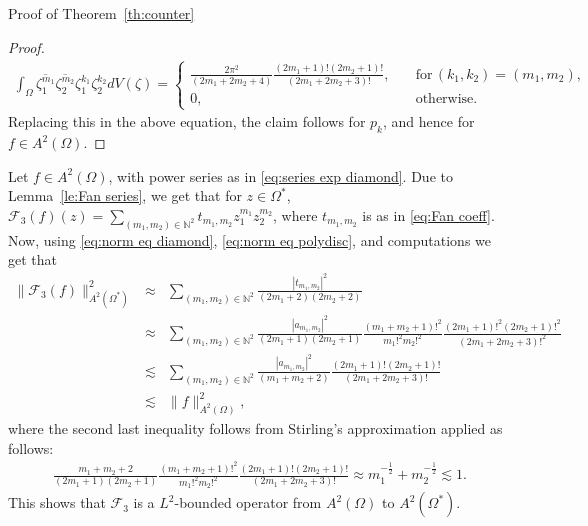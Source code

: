 \documentclass[11pt, oneside, reqno]{amsart}
\numberwithin{equation}{section}
\theoremstyle{definition}
\newcommand{\beas}{\begin{eqnarray*}}
\newcommand{\eeas}{\end{eqnarray*}}
\newcommand{\N}{\mathbb N}
\newcommand{\F}{\mathcal F}
\newcommand{\ltt}{\left(}
\newcommand{\rtt}{\right)}
\newcommand{\Om}{\Omega}
\begin{document}
{\begin{section}{Proof of Theorem~\ref{th:counter}}
\begin{proof}
      \beas
      \int_{\Om}\overline{\zeta_1^{m_1}}\overline{\zeta_2^{m_2}}\zeta_1^{k_1}\zeta_2^{k_2} dV(\zeta)=\begin{cases}
         \frac{2\pi^2}{\ltt 2m_1+2m_2+4\rtt}\frac{{\ltt 2m_1+1\rtt!}{\ltt 2m_2+1\rtt!}}{{\ltt 2m_1+2m_2+3\rtt!}},&\quad \text{for}\,(k_1,k_2)=(m_1,m_2),\\
         0,&\quad \text{otherwise}.
      \end{cases}
      \eeas
      Replacing this in the above equation, the claim follows for $p_k$, and hence for $f\in A^2\ltt\Om\rtt$.
       \end{proof}

       Let $f\in A^2\ltt\Om\rtt$, with power series as in \eqref{eq:series exp diamond}.  Due to Lemma~\ref{le:Fan series}, we get that for $z\in\Om^*$, $\F_3\ltt f\rtt(z)=\sum\limits_{(m_1,m_2)\in\N^2}t_{m_1,m_2} z_1^{m_1}z_2^{m_2}$, where
      $t_{m_1,m_2}$ is as in \eqref{eq:Fan coeff}.
    Now, using \eqref{eq:norm eq diamond}, \eqref{eq:norm eq polydisc}, and computations we get that
    \beas
    \|\F_3\ltt f\rtt\|_{A^2\ltt\Om^*\rtt}^2 &\approx&
\sum_{(m_1,m_2)\in \N^2}\frac{|t_{m_1,m_2}|^2}{(2m_1+2)(2m_2+2)}\\
&\approx&\sum_{(m_1,m_2)\in \N^2}\frac{\left|a_{m_1,m_2}\right|^2}{\ltt 2m_1+1\rtt\ltt 2m_2+1\rtt}\frac{{\ltt m_1+m_2+1\rtt!}^2}{{m_1!}^2 {m_2!}^2}\frac{{\ltt 2m_1+1\rtt!}^2{\ltt 2m_2+1\rtt!}^2}{{\ltt 2m_1+2m_2+3\rtt!}^2}
\\
&\lesssim& \sum_{(m_1,m_2)\in \N^2}\frac{|a_{m_1,m_2}|^2}{(m_1+m_2+2)}\frac{{\ltt 2m_1+1\rtt!}{\ltt 2m_2+1\rtt!}}{{\ltt 2m_1+2m_2+3\rtt!}}\\
&\lesssim& \|f\|_{A^2\ltt\Om\rtt}^2,
  \eeas
 where the second last inequality follows from Stirling's approximation applied as follows:
  \beas
\frac{m_1+m_2+2}{\ltt 2m_1+1\rtt\ltt 2m_2+1\rtt}\frac{{\ltt m_1+m_2+1\rtt!}^2}{{m_1!}^2 {m_2!}^2}\frac{{\ltt 2m_1+1\rtt!}{\ltt 2m_2+1\rtt!}}{{\ltt 2m_1+2m_2+3\rtt!}}\approx{m_1^{-\frac{1}{2}}+m_2^{-\frac{1}{2}}} \lesssim 1.
\eeas
This shows that $\F_3$ is a $L^2$-bounded operator from $A^2\ltt\Om\rtt$ to $A^2\ltt\Om^*\rtt$.


\end{section}}
\end{document}
